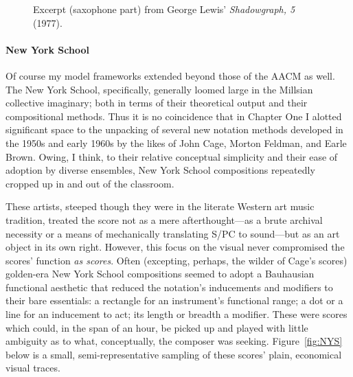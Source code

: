     \begin{figure}
        \centering
        \captionsetup{width=.5\textwidth}
        \caption[Excerpt (saxophone part) from George Lewis' \textit{Shadowgraph, 5} (1977).]{Excerpt (saxophone part) from George Lewis' \textit{Shadowgraph, 5} (1977).\footnotemark}
        \label{fig:Shadowgraph}
    \end{figure}

    \paragraph{New York School}

    Of course my model frameworks extended beyond those of the AACM as well. The New York School, specifically, generally loomed large in the Millsian collective imaginary; both in terms of their theoretical output and their compositional methods. Thus it is no coincidence that in Chapter One I alotted significant space to the unpacking of several new notation methods developed in the 1950s and early 1960s by the likes of John Cage, Morton Feldman, and Earle Brown. Owing, I think, to their relative conceptual simplicity and their ease of adoption by diverse ensembles, New York School compositions repeatedly cropped up in and out of the classroom.

    These artists, steeped though they were in the literate Western art music tradition, treated the score not as a mere afterthought---as a brute archival necessity or a means of mechanically translating S/PC to sound---but as an art object in its own right. However, this focus on the visual never compromised the scores' function \textit{as scores}. Often (excepting, perhaps, the wilder of Cage's scores) golden-era New York School compositions seemed to adopt a Bauhausian functional aesthetic that reduced the notation's inducements and modifiers to their bare essentials: a rectangle for an instrument's functional range; a dot or a line for an inducement to act; its length or breadth a modifier. These were scores which could, in the span of an hour, be picked up and played with little ambiguity as to what, conceptually, the composer was seeking. Figure~\ref{fig:NYS} below is a small, semi-representative sampling of these scores' plain, economical visual traces.
    
